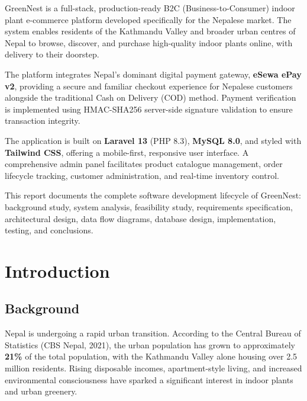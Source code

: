 \documentclass[12pt,a4paper]{report}
\begin{document}
\onehalfspacing

GreenNest is a full-stack, production-ready B2C (Business-to-Consumer) indoor plant e-commerce platform developed specifically for the Nepalese market. The system enables residents of the Kathmandu Valley and broader urban centres of Nepal to browse, discover, and purchase high-quality indoor plants online, with delivery to their doorstep.

The platform integrates Nepal's dominant digital payment gateway, \textbf{eSewa ePay v2}, providing a secure and familiar checkout experience for Nepalese customers alongside the traditional Cash on Delivery (COD) method. Payment verification is implemented using HMAC-SHA256 server-side signature validation to ensure transaction integrity.

The application is built on \textbf{Laravel 13} (PHP 8.3), \textbf{MySQL 8.0}, and styled with \textbf{Tailwind CSS}, offering a mobile-first, responsive user interface. A comprehensive admin panel facilitates product catalogue management, order lifecycle tracking, customer administration, and real-time inventory control.

This report documents the complete software development lifecycle of GreenNest: background study, system analysis, feasibility study, requirements specification, architectural design, data flow diagrams, database design, implementation, testing, and conclusions.

\newpage

\tableofcontents
\newpage
\listoffigures
\newpage
\listoftables
\newpage

\chapter{Introduction}

\section{Background}

Nepal is undergoing a rapid urban transition. According to the Central Bureau of Statistics (CBS Nepal, 2021), the urban population has grown to approximately \textbf{21\%} of the total population, with the Kathmandu Valley alone housing over 2.5 million residents. Rising disposable incomes, apartment-style living, and increased environmental consciousness have sparked a significant interest in indoor plants and urban greenery.
\end{document}
